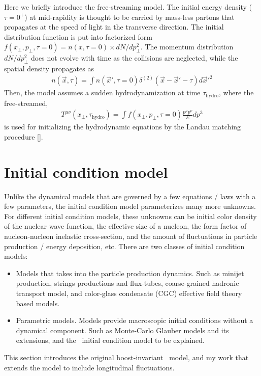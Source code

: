 Here we briefly introduce the free-streaming model.
The initial energy density ($\tau = 0^+$) at mid-rapidity is thought to be carried by mass-less partons that propagates at the speed of light in the transverse direction. 
The initial distribution function is put into factorized form $f(x_\perp, p_\perp, \tau=0) = n(x, \tau=0) \times dN/dp_\perp^2$.
The momentum distribution $dN/dp_\perp^2$ does not evolve with time as the collisions are neglected, while the spatial density propagates as
\begin{eqnarray}
n(\vec{x}, \tau) = \int n(\vec{x}', \tau=0) \delta^{(2)}(\vec{x} - \vec{x}'- \tau) d\vec{x}'^2
\end{eqnarray}
Then, the model assumes a sudden hydrodynamization at time $\tau_{\textrm{hydro}}$, where the free-streamed,
\begin{eqnarray}
T^{\mu\nu}(x_\perp, \tau_{\textrm{hydro}}) = \int f(x_\perp, p_\perp, \tau=0) \frac{p^\mu p^\nu}{E} dp^3
\end{eqnarray}
is used for initializing the hydrodynamic equations by the Landau matching procedure [].

\section{Initial condition model}
Unlike the dynamical models that are governed by a few equations / laws with a few parameters, the initial condition model parameterizes many more unknowns.
For different initial condition models, these unknowns can be initial color density of the nuclear wave function, the effective size of a nucleon, the form factor of nucleon-nucleon inelastic cross-section, and the amount of fluctuations in particle production / energy deposition, etc.
There are two classes of initial condition models:
\begin{itemize}
\item Models that takes into the particle production dynamics. Such as minijet production, strings productions and flux-tubes, coarse-grained hadronic transport model, and color-glass condensate (CGC) effective field theory based models.
\item Parametric models. Models provide macroscopic initial conditions without a dynamical component. Such as Monte-Carlo Glauber models and its extensions, and the \trento\ initial condition model to be explained.
\end{itemize}
This section introduces the original boost-invariant \trento\ model, and my work that extends the model to include longitudinal fluctuations.

